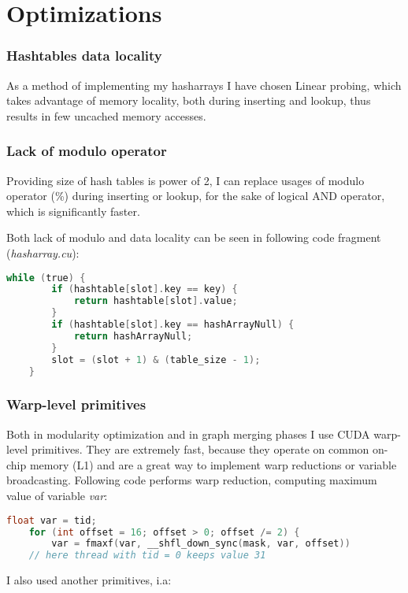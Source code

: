 \documentclass[12pt]{article}
\begin{document}
\section*{\fontsize{18}{18}\selectfont Optimizations}

\subsubsection*{Hashtables data locality}
    
     As a method of implementing my hasharrays I have chosen Linear probing, which takes advantage of memory locality, both during inserting and lookup, thus results in few uncached memory accesses. 
    
\subsubsection*{Lack of modulo operator}
    
    Providing size of hash tables is power of 2, I can replace usages of modulo operator (\%) during inserting or lookup, for the sake of logical AND operator, which is significantly faster.
    
    Both lack of modulo and data locality can be seen in following code fragment (\emph{hasharray.cu}):
    \begin{lstlisting}[language=C]
    while (true) {
        if (hashtable[slot].key == key) {
            return hashtable[slot].value;
        }
        if (hashtable[slot].key == hashArrayNull) {
            return hashArrayNull;
        }
        slot = (slot + 1) & (table_size - 1);
    }
    \end{lstlisting}
    
\subsubsection*{Warp-level primitives}
    Both in modularity optimization and in graph merging phases I use CUDA warp-level primitives. They are extremely fast, because they operate on common on-chip memory (L1) and are a great way to implement warp reductions or variable broadcasting.
    Following code performs warp reduction, computing maximum value of variable \emph{var}:
    
    \begin{lstlisting}[language=C]
    float var = tid;
    for (int offset = 16; offset > 0; offset /= 2) {
        var = fmaxf(var, __shfl_down_sync(mask, var, offset))
    // here thread with tid = 0 keeps value 31
    \end{lstlisting}
    I also used another primitives, i.a:
    
\end{document}
